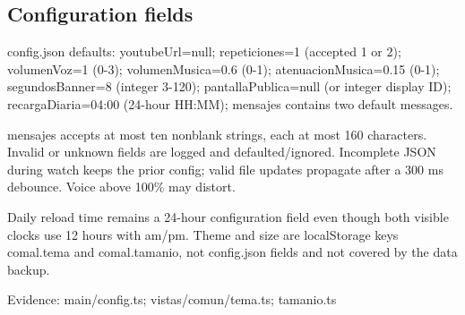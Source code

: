 \subsection{Configuration fields}

config.json defaults: youtubeUrl=null; repeticiones=1 (accepted 1 or 2); volumenVoz=1 (0-3); volumenMusica=0.6 (0-1); atenuacionMusica=0.15 (0-1); segundosBanner=8 (integer 3-120); pantallaPublica=null (or integer display ID); recargaDiaria=04:00 (24-hour HH:MM); mensajes contains two default messages.

mensajes accepts at most ten nonblank strings, each at most 160 characters. Invalid or unknown fields are logged and defaulted/ignored. Incomplete JSON during watch keeps the prior config; valid file updates propagate after a 300 ms debounce. Voice above 100\% may distort.

Daily reload time remains a 24-hour configuration field even though both visible clocks use 12 hours with am/pm. Theme and size are localStorage keys comal.tema and comal.tamanio, not config.json fields and not covered by the data backup.

Evidence: main/config.ts; vistas/comun/tema.ts; tamanio.ts
